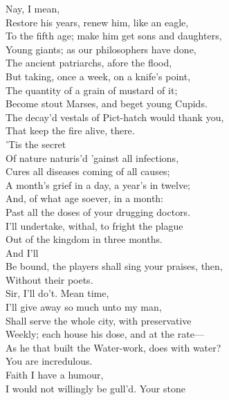 \documentclass[a4paper,oneside]{memoir}
\begin{document}
\begin{drama*}
\mammonspeaks {} Nay, I mean,\\
Restore his years, renew him, like an eagle,\\
To the fifth age; make him get sons and daughters,\\
Young giants; as our philosophers have done,\\
The ancient patriarchs, afore the flood,\\
But taking, once a week, on a knife's point,\\
The quantity of a grain of mustard of it;\\
Become stout Marses, and beget young Cupids.\\
\surlyspeaks The decay'd vestals of Pict-hatch would thank you,\\
That keep the fire alive, there.\\
\mammonspeaks {} 'Tis the secret\\
Of nature naturis'd 'gainst all infections,\\
Cures all diseases coming of all causes;\\
A month's grief in a day, a year's in twelve;\\
And, of what age soever, in a month:\\
Past all the doses of your drugging doctors.\\
I'll undertake, withal, to fright the plague\\
Out of the kingdom in three months.\\
\surlyspeaks {} And I'll\\
Be bound, the players shall sing your praises, then,\\
Without their poets.\\
\mammonspeaks {} Sir, I'll do't. Mean time,\\
I'll give away so much unto my man,\\
Shall serve the whole city, with preservative\\
Weekly; each house his dose, and at the rate---\\
\surlyspeaks As he that built the Water-work, does with water?\\
\mammonspeaks You are incredulous.\\
\surlyspeaks {} Faith I have a humour,\\
I would not willingly be gull'd. Your stone\\

\end{drama*}
\end{document}
